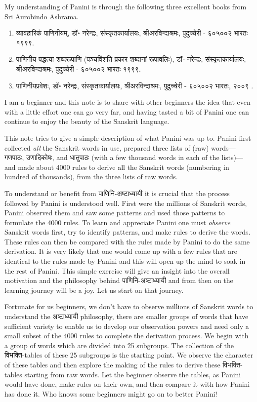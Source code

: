 \documentclass[leqno,fleqn,12pt]{article}%
\newenvironment{ewosp}{\begin{enumerate} \setlength{\itemsep}{0mm}
    \setlength{\parskip}{0mm}}{\end{enumerate}}
\begin{document}
My understanding of Panini is through the following three excellent books from Sri Aurobindo Ashrama.
\begin{ewosp}
\item व्यावहारिकं पाणिनीयम्, डॉ॰ नरेन्द्रः, संस्कृतकार्यालयः, श्रीअरविन्दाश्रमः, पुदुच्चेरी - ६०५००२ भारतः १९९९.
\item पाणिनीय-पद्धत्या शब्दरूपाणि (पञ्चविंशति-प्रकार-शब्दानां रूपावलिः), डॉ॰ नरेन्द्रः, संस्कृतकार्यालयः, श्रीअरविन्दाश्रमः, पुदुच्चेरी - ६०५००२ भारतः १९९९.
\item पाणिनीयप्रवेशः, डॉ॰ नरेन्द्रः, संस्कृतकार्यालयः, श्रीअरविन्दाश्रमः, पुदुच्चेरी - ६०५००२ भारतः, २००९ .
\end{ewosp}
I am a beginner and this note is to share with other beginners the idea that even with a little effort one can go very far, and having tasted a bit of Panini one can continue to enjoy the beauty of the Sanskrit language.

This note tries to give a simple description of what Panini was up to. Panini first collected {\em all} the Sanskrit words in use, prepared three lists of (raw) words---गणपाठः, उणादिकोषः, and धातुपाठः (with a few thousand words in each of the lists)---and made about 4000 rules to derive all the Sanskrit words (numbering in hundred of thousands), from the three lists of raw words. 

To understand or benefit from पाणिनि-अष्टाध्यायी it is crucial that the process followed by Panini is understood well. First were the millions of Sanskrit words, Panini observed them and saw some patterns and used those patterns to formulate the 4000 rules. To learn and appreciate Panini one must {\em observe} Sanskrit words first, try to identify patterns, and make rules to derive the words. These rules can then be compared with the rules made by Panini to do the same derivation. It is very likely that one would come up with a few rules that are identical to the rules made by Panini and this will open up the mind to soak in the rest of Panini. This simple exercise will give an insight into the overall motivation and the philosophy behind पाणिनि-अष्टाध्यायी and from then on the learning journey will be a joy. Let us start on that journey.

Fortunate for us beginners, we don't have to observe millions of Sanskrit words to understand the अष्टाध्यायी philosophy, there are smaller groups of words that have sufficient variety to enable us to develop our observation powers and need only a small subset of the 4000 rules to complete the derivation process. We begin with a group of words which are divided into 25 subgroups.  The collection of the विभक्ति-tables of these 25 subgroups is the starting point. We observe the character of these tables and then explore the making of the rules to derive these विभक्ति-tables starting from raw words. Let the beginner observe the tables, as Panini would have done, make rules on their own, and then compare it with how Panini has done it. Who knows some beginners might go on to better Panini!
\end{document}
